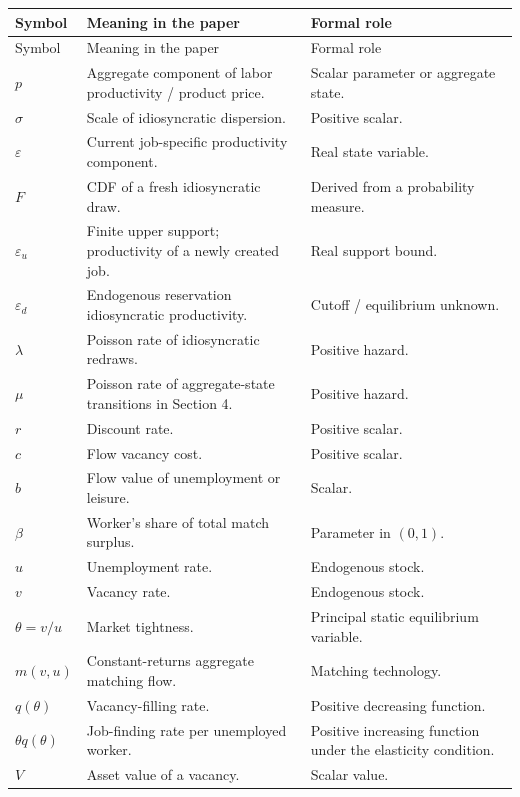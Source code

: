 \documentclass[11pt]{article}
\newcommand{\epsd}{\varepsilon_d}
\newcommand{\epsu}{\varepsilon_u}
\begin{document}
\begin{longtable}{>{\raggedright\arraybackslash}p{} >{\raggedright\arraybackslash}p{} >{\raggedright\arraybackslash}p{}}
\toprule
Symbol & Meaning in the paper & Formal role \\
\midrule
\endfirsthead
\toprule
Symbol & Meaning in the paper & Formal role \\
\midrule
\endhead
$p$ & Aggregate component of labor productivity / product price. & Scalar parameter or aggregate state. \\
$\sigma$ & Scale of idiosyncratic dispersion. & Positive scalar. \\
$\varepsilon$ & Current job-specific productivity component. & Real state variable. \\
$F$ & CDF of a fresh idiosyncratic draw. & Derived from a probability measure. \\
$\epsu$ & Finite upper support; productivity of a newly created job. & Real support bound. \\
$\epsd$ & Endogenous reservation idiosyncratic productivity. & Cutoff / equilibrium unknown. \\
$\lambda$ & Poisson rate of idiosyncratic redraws. & Positive hazard. \\
$\mu$ & Poisson rate of aggregate-state transitions in Section 4. & Positive hazard. \\
$r$ & Discount rate. & Positive scalar. \\
$c$ & Flow vacancy cost. & Positive scalar. \\
$b$ & Flow value of unemployment or leisure. & Scalar. \\
$\beta$ & Worker's share of total match surplus. & Parameter in $(0,1)$. \\
$u$ & Unemployment rate. & Endogenous stock. \\
$v$ & Vacancy rate. & Endogenous stock. \\
$\theta=v/u$ & Market tightness. & Principal static equilibrium variable. \\
$m(v,u)$ & Constant-returns aggregate matching flow. & Matching technology. \\
$q(\theta)$ & Vacancy-filling rate. & Positive decreasing function. \\
$\theta q(\theta)$ & Job-finding rate per unemployed worker. & Positive increasing function under the elasticity condition. \\
$V$ & Asset value of a vacancy. & Scalar value. \\

\end{longtable}
\end{document}
